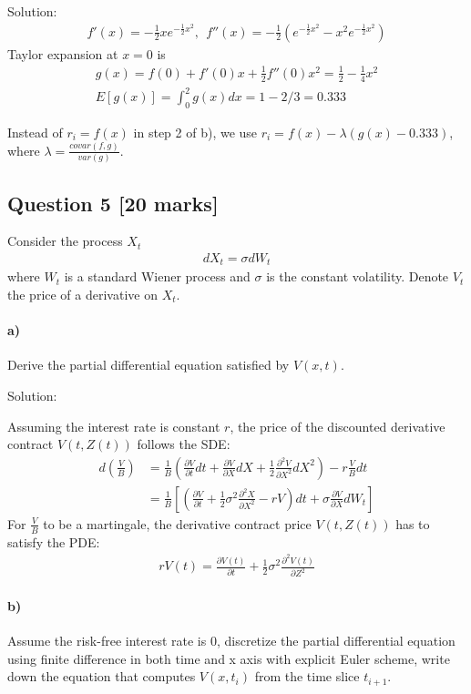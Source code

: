 \documentclass[11pt,a4paper,hidelinks,fleqn]{article}            %
\begin{document}
Solution:
\begin{align*}
f'(x) = -\frac12 x e^{-\frac12 x^2}, ~~f''(x) = -\frac12 (e^{-\frac12 x^2} - x^2 e^{-\frac12 x^2})
\end{align*}
Taylor expansion at $x=0$ is 
\begin{align*}
g(x) = f(0) + f'(0) x + \frac12 f''(0) x^2 = \frac12 - \frac14 x^2 \\
E[g(x)] = \int_0^2 g(x) dx = 1 - 2/3 = 0.333
\end{align*}

Instead of $r_i = f(x)$ in step 2 of b), 
we use $r_i = f(x) - \lambda(g(x) - 0.333)$, where $\lambda = \frac{covar(f, g)}{var(g)}$.

\subsection*{Question 5 [20 marks]}
Consider the process $X_t$
\begin{align*}
dX_t = \sigma dW_t
\end{align*}
where $W_t$ is a standard Wiener process and 
$\sigma$ is the constant volatility.
Denote $V_t$ the price of a derivative on $X_t$.

\paragraph{a)} Derive the partial differential equation satisfied by $V(x, t)$.

Solution:

Assuming the interest rate is constant $r$,
the price of the discounted derivative contract $V(t, Z(t))$ follows the SDE:
\begin{align}
d\left(\frac{V}{B}\right) & = \frac{1}{B}\left(\frac{\partial V}{\partial t} dt + \frac{\partial V}{\partial X} dX + \frac{1}{2}\frac{\partial^2 V}{\partial X^2} dX^2 \right) - r\frac{V}{B}dt  \\
   & = \frac{1}{B} \left[\left(\frac{\partial V}{\partial t} + \frac{1}{2} \sigma^2 \frac{\partial^2 X}{\partial X^2} - rV\right)dt + \sigma \frac{\partial V}{\partial X} dW_t \right]
\end{align}
For $\frac{V}{B}$ to be a martingale, 
the derivative contract price $V(t, Z(t))$ has to satisfy the PDE:
\begin{align}
rV(t) = \frac{\partial V(t)}{\partial t} + \frac{1}{2} \sigma^2 \frac{\partial^2 V(t)}{\partial Z^2}
\end{align}


\paragraph{b)} Assume the risk-free interest rate is 0,
discretize the partial differential equation using finite difference in both time and x axis with explicit Euler scheme,
write down the equation that computes $V(x, t_i)$ from the time slice $t_{i+1}$.
\end{document}
